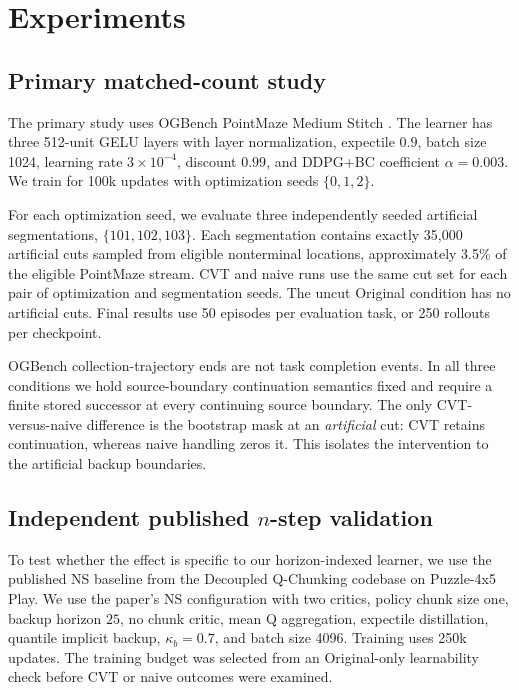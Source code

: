 \section{Experiments}

\subsection{Primary matched-count study}

The primary study uses OGBench PointMaze Medium Stitch \cite{ogbench2024}. The learner has three 512-unit GELU layers with layer normalization, expectile $0.9$, batch size 1024, learning rate $3\times10^{-4}$, discount $0.99$, and DDPG+BC coefficient $\alpha=0.003$. We train for 100k updates with optimization seeds $\{0,1,2\}$.

For each optimization seed, we evaluate three independently seeded artificial segmentations, $\{101,102,103\}$. Each segmentation contains exactly 35,000 artificial cuts sampled from eligible nonterminal locations, approximately 3.5\% of the eligible PointMaze stream. CVT and naive runs use the same cut set for each pair of optimization and segmentation seeds. The uncut Original condition has no artificial cuts. Final results use 50 episodes per evaluation task, or 250 rollouts per checkpoint.

OGBench collection-trajectory ends are not task completion events. In all three conditions we hold source-boundary continuation semantics fixed and require a finite stored successor at every continuing source boundary. The only CVT-versus-naive difference is the bootstrap mask at an \emph{artificial} cut: CVT retains continuation, whereas naive handling zeros it. This isolates the intervention to the artificial backup boundaries.

\subsection{Independent published $n$-step validation}

To test whether the effect is specific to our horizon-indexed learner, we use the published NS baseline from the Decoupled Q-Chunking codebase \cite{li2026dqc} on Puzzle-4x5 Play. We use the paper's NS configuration with two critics, policy chunk size one, backup horizon $25$, no chunk critic, mean Q aggregation, expectile distillation, quantile implicit backup, $\kappa_b=0.7$, and batch size 4096. Training uses 250k updates. The training budget was selected from an Original-only learnability check before CVT or naive outcomes were examined.

